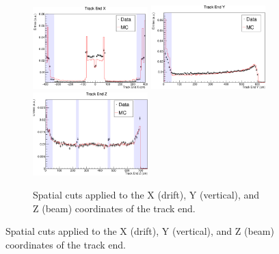 \begin{figure}

	\begin{subfigure}[b]{\textwidth}
		\centering
		\includegraphics[width=0.488\textwidth]{figures/endX_nocuts.pdf}
		\hfill
		\includegraphics[width=0.488\textwidth]{figures/endY_nocuts.pdf}
		\includegraphics[width=0.488\textwidth]{figures/endZ_nocuts.pdf}
		\caption {Spatial cuts applied to the X (drift), Y (vertical), and Z (beam) 
		coordinates of the track end.}
		\label{fig:spatial_cuts}
	\end{subfigure}


\end{figure}
